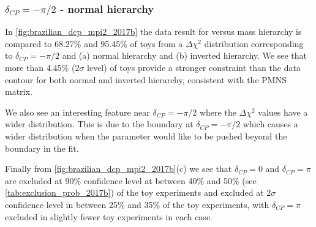 \begin{table}[htb]
	\centering
	
	\caption{
		The confidence intervals at 90\% CL and $2\sigma$ CL obtained with the Feldman-Cousins method for the \RunPeriod data set is shown for the measurement of \deltacp versus mass hierarchy.
	}
	\label{tab:fc_interval_2017b}
\end{table}

\subsubsection{$\delta_{CP} = -\pi/2$ - normal hierarchy}

In \cref{fig:brazilian_dcp_mpi2_2017b} the \RunPeriod data result for \deltacp versus mass hierarchy is compared to \color{blue}68.27\% and 95.45\% of toys from a $\Delta\chi^2$ distribution\color{black} corresponding to $\delta_{CP} = -\pi/2$ and (a) normal hierarchy and (b) inverted hierarchy. \color{blue}We see that more than 4.45\% ($2\sigma$ level) of toys provide a stronger constraint than the data contour for both normal and inverted hierarchy, consistent with the PMNS matrix\color{black}.

\color{blue}We also see an interesting feature near $\delta_{CP} = -\pi/2$ where the $\Delta\chi^2$ values have a wider distribution. This is due to the boundary at $\delta_{CP} = -\pi/2$ which causes a wider distribution when the parameter \deltacp would like to be pushed beyond the boundary in the fit.\color{black}

Finally from \cref{fig:brazilian_dcp_mpi2_2017b}(c) we see that $\delta_{CP} = 0$ and $\delta_{CP} = \pi$ are excluded at 90\% confidence level at between 40\% and 50\% (see \cref{tab:exclusion_prob_2017b}) of the toy experiments and excluded at $2\sigma$ confidence level in between 25\% and 35\% of the toy experiments, with $\delta_{CP} = \pi$ excluded in slightly fewer toy experiments in each case.

